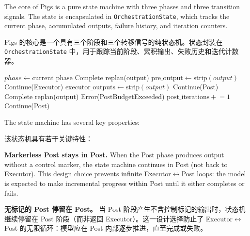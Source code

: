 The core of Pigs is a pure state machine with three phases and three transition signals. The state is encapsulated in \texttt{OrchestrationState}, which tracks the current phase, accumulated outputs, failure history, and iteration counters.
\begin{chinese}
Pigs 的核心是一个具有三个阶段和三个转移信号的纯状态机。状态封装在 \texttt{OrchestrationState} 中，用于跟踪当前阶段、累积输出、失败历史和迭代计数器。
\end{chinese}

\begin{algorithm}[t]
\caption{Phase state machine transition}
\label{alg:state}
\begin{algorithmic}[1]
  \State $phase \gets \text{current phase}$
      \State \Return Complete 
      \State \Return replan(output) 
    \Else
      \State $\text{pre\_output} \gets \text{strip}(output)$
      \State \Return Continue(Executor)
    \EndIf
    \State $\text{executor\_outputs} \gets \text{strip}(output)$
    \State \Return Continue(Post) 
  \Else {}
      \State \Return Complete
      \State \Return replan(output)
    \Else
        \State \Return Error(PostBudgetExceeded)
      \EndIf
      \State $\text{post\_iterations} \mathrel{+}= 1$
      \State \Return Continue(Post) 
    \EndIf
  \EndIf
\EndFunction
\end{algorithmic}
\end{algorithm}

The state machine has several key properties:
\begin{chinese}
该状态机具有若干关键特性：
\end{chinese}

\textbf{Markerless Post stays in Post.} When the Post phase produces output without a control marker, the state machine continues in Post (not back to Executor). This design choice prevents infinite Executor$\leftrightarrow$Post loops: the model is expected to make incremental progress within Post until it either completes or fails.
\begin{chinese}
\textbf{无标记的 Post 停留在 Post。} 当 Post 阶段产生不含控制标记的输出时，状态机继续停留在 Post 阶段（而非返回 Executor）。这一设计选择防止了 Executor$\leftrightarrow$Post 的无限循环：模型应在 Post 内部逐步推进，直至完成或失败。
\end{chinese}

